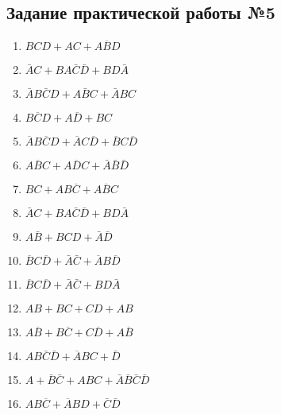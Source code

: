 \subsection{Задание практической работы №5}
\begin{enumerate}
\item $BCD+AC+A\overline{B}D$
\item $\bar{A}C+BA\bar{C}\bar{D}+BD\bar{A}$
\item $\bar{A}B\bar{C}D+A\bar{B}C+\bar{A}BC$
\item $B\overline{C}D+A\overline{D}+BC$
\item $\overline{A}B\overline{C}D+\overline{A}C\overline{D}+\overline{B}C\overline{D}$
\item $A\overline{B}C+A\overline{D}C+\bar{A}\bar{B}\bar{D}$
\item $BC+AB\overline{C}+A\overline{B}C$
\item $\bar{A}C+BA\bar{C}\bar{D}+BD\bar{A}$
\item $A\bar{B} + BCD + \bar{A}\bar{D}$

\item $\overline{B}C\overline{D} + \bar{A}\bar{C} + \overline{A}B\overline{D}$
\item $\overline{B}C\overline{D} + \bar{A}\bar{C} + BD\bar{A}$
\item $AB + BC + CD + AB$
\item $A\overline{B} + B\overline{C} + C\overline{D} + A\overline{B}$

\item $AB\bar{C}\bar{D} + \overline{A}BC + \bar{D}$
\item $A + \bar{B}\bar{C} + ABC + \bar{A}\bar{B}\bar{C}\bar{D}$
\item $AB\overline{C} + \overline{A}BD + \bar{C}\bar{D}$
\end{enumerate}

